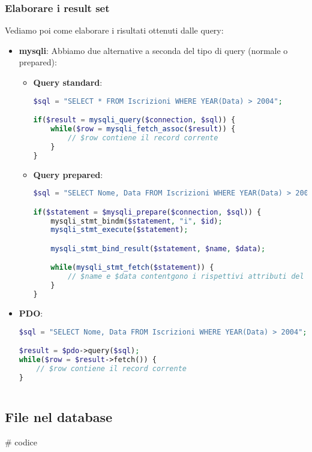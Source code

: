 \documentclass[a4paper,11pt]{article}
\begin{document}
\subsubsection{Elaborare i result set}
Vediamo poi come elaborare i risultati ottenuti dalle query:
\begin{itemize}
	\item \textbf{mysqli}:
		Abbiamo due alternative a seconda del tipo di query (normale o prepared):
		\begin{itemize}
			\item \textbf{Query standard}:
\begin{lstlisting}[language=php, style=codestyle]	
$sql = "SELECT * FROM Iscrizioni WHERE YEAR(Data) > 2004";

if($result = mysqli_query($connection, $sql)) {
	while($row = mysqli_fetch_assoc($result)) {
		// $row contiene il record corrente
	}
}
\end{lstlisting}
			\item \textbf{Query prepared}:
\begin{lstlisting}[language=php, style=codestyle]	
$sql = "SELECT Nome, Data FROM Iscrizioni WHERE YEAR(Data) > 2004";

if($statement = $mysqli_prepare($connection, $sql)) {
	mysqli_stmt_bindm($statement, "i", $id);
	mysqli_stmt_execute($statement);

	mysqli_stmt_bind_result($statement, $name, $data);

	while(mysqli_stmt_fetch($statement)) {
		// $name e $data contentgono i rispettivi attributi del record corrente
	}
}
			\end{lstlisting}
		\end{itemize}
	\item \textbf{PDO}:
\begin{lstlisting}[language=php, style=codestyle]	
$sql = "SELECT Nome, Data FROM Iscrizioni WHERE YEAR(Data) > 2004";

$result = $pdo->query($sql);
while($row = $result->fetch()) {
	// $row contiene il record corrente
}
\end{lstlisting}
\begin{lstlisting}[language=php, style=codestyle]	

\end{lstlisting}
\end{itemize}

\subsection{File nel database} # codice
\end{document}
